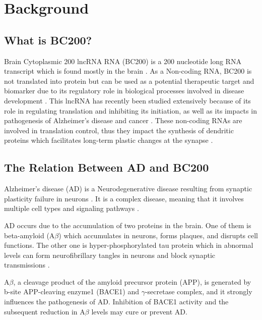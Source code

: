 \documentclass[conference]{IEEEtran}
\begin{document}
\section{Background}\label{sec:background}

\subsection{What is BC200?}

Brain Cytoplasmic 200 lncRNA RNA (BC200) is a 200 nucleotide long RNA transcript which is found mostly in the brain \cite{tiedge1993primary}. 
As a Non-coding RNA, BC200 is not translated into protein but can be used as a potential therapeutic target and biomarker due to its regulatory role in biological processes involved in disease development \cite{zhang2021role,mus2007dendritic}. 
This lncRNA has recently been studied extensively because of its role in regulating translation and inhibiting its initiation, as well as its impacts in pathogenesis of Alzheimer's disease and cancer \cite{zhang2021role,tiedge1993primary}. 
These non-coding RNAs are involved in translation control, thus they impact the synthesis of dendritic proteins which facilitates long-term plastic changes at the synapse \cite{mus2007dendritic}.

\subsection{The Relation Between AD and BC200}

Alzheimer's disease (AD) is a Neurodegenerative disease resulting from synaptic plasticity failure in neurons \cite{mus2007dendritic}. 
It is a complex disease, meaning that it involves multiple cell types and signaling pathways \cite{zhang2021role}.

AD occurs due to the accumulation of two proteins in the brain. 
One of them is beta-amyloid (A$\beta$) which accumulates in neurons, forms plaques, and disrupts cell functions. 
The other one is hyper-phosphorylated tau protein which in abnormal levels can form neurofibrillary tangles in neurons and block synaptic transmissions \cite{zhang2021role}.

A$\beta$, a cleavage product of the amyloid precursor protein (APP), is generated by b-site APP-cleaving enzyme1 (BACE1) and $\gamma$-secretase complex, and it strongly influences the pathogenesis of AD. 
Inhibition of BACE1 activity and the subsequent reduction in A$\beta$ levels may cure or prevent AD\cite{li2018identification,zhang2021role}.
\end{document}
